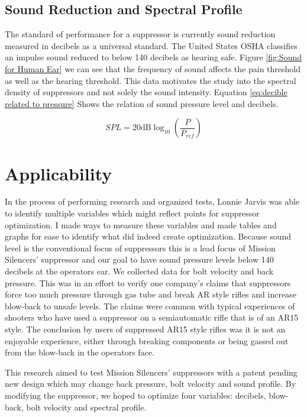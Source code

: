 \subsection{Sound Reduction and Spectral Profile}

The standard of performance for a suppressor is currently sound reduction measured in decibels as a universal standard. The United States OSHA classifies an impulse sound reduced to below 140 decibels as hearing safe. Figure \ref{fig:Sound for Human Ear} we can see that the frequency of sound affects the pain threshold as well as the hearing threshold. This data motivates the study into the spectral density of suppressors and not solely the sound intensity. Equation \ref{eq:decible related to pressure} Shows the relation of sound pressure level and decibels.






\begin{equation}
	SPL=20\mathrm{dB}\log_{10} (\frac{P}{P_{ref}})
	\label{eq:decible related to pressure}
\end{equation}





\section{Applicability}

In the process of performing research and organized tests, Lonnie Jarvis was able to identify multiple variables which might reflect points for suppressor optimization. I made ways to measure these variables and made tables and graphs for ease to identify what did indeed create optimization. Because sound level is the conventional focus of suppressors this is a lead focus of Mission Silencers' suppressor and our goal to have sound pressure levels below 140 decibels at the operators ear. We collected data for bolt velocity and back pressure. This was in an effort to verify one company's claims that suppressors force too much pressure through gas tube and break AR style rifles and increase blow-back to unsafe levels. The claims were common with typical experiences of shooters who have used a suppressor on a semiautomatic rifle that is of an AR15 style. The conclusion by users of suppressed AR15 style rifles was it is not an enjoyable experience, either through breaking components or being gassed out from the blow-back in the operators face. 

This research aimed to test Mission Silencers' suppressors with a patent pending new design which may change back pressure, bolt velocity and sound profile. By modifying the suppressor, we hoped to optimize four variables: decibels, blow-back, bolt velocity and spectral profile.

